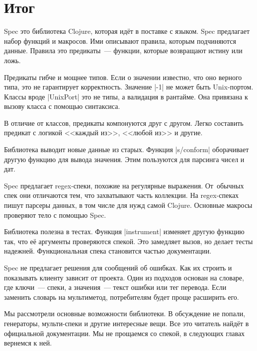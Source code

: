 \section{Итог}

Spec это библиотека Clojure, которая ид\"{е}т в поставке с языком. Spec предлагает
набор функций и макросов. Ими описывают правила, которым подчиняются
данные. Правила это предикаты~--- функции, которые возвращают истину или ложь.

Предикаты гибче и мощнее типов. Если о значении известно, что оно верного типа,
это не гарантирует корректность. Значение \spverb|-1| не может быть
Unix-портом. Классы вроде \spverb|UnixPort| это не типы, а валидация в
рантайме. Она привязана к вызову класса с помощью синтаксиса.

В отличие от классов, предикаты компонуются друг с другом. Легко составить
предикат с логикой <<каждый из>>, <<любой из>> и другие.

Библиотека выводит новые данные из старых. Функция \spverb|s/conform|
оборачивает другую функцию для вывода значения. Этим пользуются для парсинга
чисел и дат.

Spec предлагает regex-спеки, похожие на регулярные выражения. От~обычных спек
они отличаются тем, что захватывают часть коллекции. На regex-спеках пишут
парсеры данных, в том числе для нужд самой Clojure. Основные макросы проверяют
тело с помощью Spec.

Библиотека полезна в тестах. Функция \spverb|instrument| изменяет другую функцию
так, что е\"{е} аргументы проверяются спекой. Это замедляет вызов, но делает тесты
надежней. Функциональная спека становится частью документации.

Spec не предлагает решения для сообщений об ошибках. Как их строить и показывать
клиенту зависит от проекта. Один из подходов основан на словаре, где ключи~---
спеки, а значения~--- текст ошибки или тег перевода. Если заменить словарь на
мультиметод, потребителям будет проще расширить его.

Мы рассмотрели основные возможности библиотеки. В обсуждение не попали,
генераторы, мульти-спеки и другие интересные вещи. Все это читатель найд\"{е}т в
официальной документации. Мы не прощаемся со спекой, в следующих главах вернемся
к ней.
